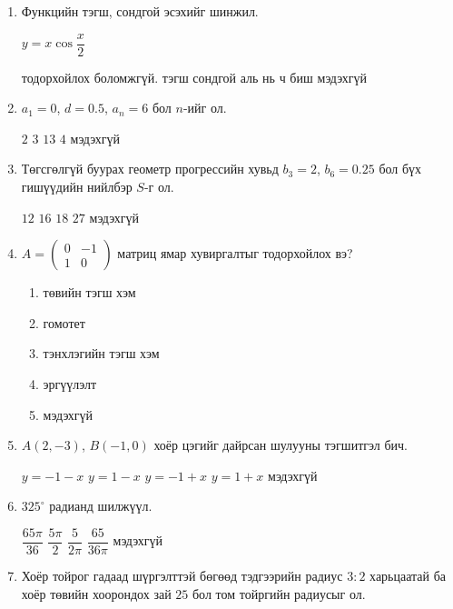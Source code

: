 \documentclass{exam}
\begin{document}
\begin{enumerate}
 \item Функцийн тэгш, сондгой эсэхийг шинжил.

 $y=x\cos\dfrac{x}{2}$
 
 \begin{oneparchoices}
 \choice тодорхойлох боломжгүй.
 \choice тэгш
 \choice сондгой 
 \choice аль нь ч биш
 \choice мэдэхгүй
\end{oneparchoices}
 \item $a_1=0$, $d=0.5$, $a_n=6$ бол $n$-ийг ол.
 
 \begin{oneparchoices}
 \choice $2$
 \choice $3$
 \choice $13$
 \choice $4$
 \choice мэдэхгүй
\end{oneparchoices} 
 \item Төгсгөлгүй буурах геометр прогрессийн хувьд $b_3=2$, $b_6=0.25$ бол бүх гишүүдийн нийлбэр $S$-г ол. 
 
 \begin{oneparchoices}
 \choice $12$
 \choice $16$
 \choice $18$
 \choice $27$
 \choice мэдэхгүй
\end{oneparchoices}  
 \item $A=\begin{pmatrix}
    0 & -1\\
    1 & 0
    \end{pmatrix}$ матриц ямар хувиргалтыг тодорхойлох вэ?
    
    \begin{enumerate}
        \item төвийн тэгш хэм 
        \item гомотет
        \item тэнхлэгийн тэгш хэм
        \item эргүүлэлт
        \item мэдэхгүй
    \end{enumerate}
 \item $A(2,-3)$, $B(-1,0)$ хоёр цэгийг дайрсан шулууны тэгшитгэл бич. 

\begin{oneparchoices}
 \choice $y=-1-x$
 \choice $y=1-x$  
 \choice $y=-1+x$  
 \choice $y=1+x$
 \choice мэдэхгүй
\end{oneparchoices}
 \item $325^\circ$ радианд шилжүүл. 
 \begin{oneparchoices}
 \choice $\dfrac{65\pi}{36}$
 \choice $\dfrac{5\pi}{2}$  
 \choice $\dfrac{5}{2\pi}$ 
 \choice $\dfrac{65}{36\pi}$
 \choice мэдэхгүй
\end{oneparchoices}
 \item Хоёр тойрог гадаад шүргэлттэй бөгөөд тэдгээрийн радиус $3:2$ харьцаатай ба хоёр төвийн хоорондох зай $25$ бол том тойргийн радиусыг ол. 


\end{enumerate}
\end{document}
